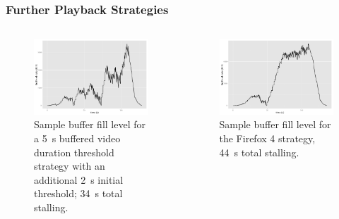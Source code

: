 \documentclass{beamer}
\begin{document}
\begin{frame}
	\frametitle{Further Playback Strategies}

	\begin{columns}[T]
		\begin{figure}
			\centering
			\includegraphics[width=1.0\columnwidth]{../../chapters/03-streaming/images/R-bufferlevel-flash.pdf}
			\caption{Sample buffer fill level for a \SI{5}{\second} buffered video duration threshold strategy with an additional \SI{2}{\second} initial threshold; \SI{34}{\second} total stalling.}
		\end{figure}

		\begin{figure}
			\centering
			\includegraphics[width=1.0\columnwidth]{../../chapters/03-streaming/images/R-bufferlevel-firefox.pdf}
			\caption{Sample buffer fill level for the Firefox 4 strategy, \SI{44}{\second} total stalling.}
		\end{figure}
	\end{columns}
\end{frame}
\end{document}
